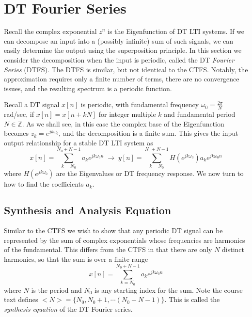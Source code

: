 \chapter{DT Fourier Series}

Recall the complex exponential $z^n$ is the Eigenfunction of DT LTI systems. If we can decompose an input into a (possibly infinite) sum of such signals, we can easily determine the output using the superposition principle. In this section we consider the decomposition when the input is periodic, called the DT \emph{Fourier Series} (DTFS). The DTFS is similar, but not identical to the CTFS. Notably, the approximation requires only a finite number of terms, there are no convergence issues, and the resulting spectrum is a periodic function.

Recall a DT signal $x[n]$ is periodic, with fundamental frequency $\omega_0 = \frac{2\pi}{N}$ rad/sec, if $x[n] = x[n+kN]$ for integer multiple $k$ and fundamental period $N \in \mathbb{Z}$. As we shall see, in this case the complex base of the Eigenfunction becomes $z_k = e^{jk\omega_0}$, and the decomposition is a finite sum. This gives the input-output relationship for a stable DT LTI system as 
\[
x[n] = \sum\limits_{k = N_0}^{N_0 + N-1} a_k e^{jk\omega_0n} \;\longrightarrow\;  y[n] = \sum\limits_{k = N_0}^{N_0 + N-1} H\left(e^{j k\omega_0}\right) a_k e^{jk\omega_0 n} 
\]
where $H\left(e^{j k\omega_0}\right)$ are the Eigenvalues or DT frequency response. We now turn to how to find the coefficients $a_k$.

\section{Synthesis and Analysis Equation}

Similar to the CTFS we wish to show that any periodic DT signal can be represented by the sum of complex exponentials whose frequencies are harmonics of the fundamental. This differs from the CTFS in that there are only $N$ distinct harmonics, so that the sum is over a finite range
\[  
\boxed{x[n] = \sum\limits_{k = N_0}^{N_0 + N-1} a_k e^{jk\omega_0n} }
\]
where $N$ is the period and $N_0$ is any starting index for the sum. Note the course text defines $<N> = \{ N_0, N_0 + 1,  \cdots (N_0 + N-1) \}$. This is called the \emph{synthesis equation} of the DT Fourier series.

